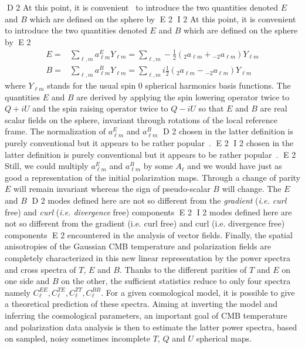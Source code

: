 D 2
At this point, it is convenient~\cite{zalda} to introduce the two quantities denoted $E$ and $B$ which are defined on the sphere by 
E 2
I 2
At this point, it is convenient~\citep{zalda} to introduce the two quantities denoted $E$ and $B$ which are defined on the sphere by 
E 2
\begin{eqnarray}\label{EB}
E = &  \sum_{\ell, m}   a_{\ell m} ^E Y_{\ell m} =  \sum_{\ell, m}  - \frac{ 1}{2}   ({_{ 2}a_{\ell m}}  +  {_{- 2}a_{\ell m}} )    Y_{\ell m} \\ \nonumber
B = & \sum_{\ell, m}   a_{\ell m} ^B Y_{\ell m} =  \sum_{\ell, m}  i \frac{ 1}{2}    ({_{ 2}a_{\ell m}}  -  {_{- 2}a_{\ell m}} )   Y_{\ell m} 
\end{eqnarray} 
where $Y_{\ell m}$ stands for the usual spin 0 spherical harmonics basis functions. The quantities $E$ and $B$ are derived by applying 
the spin lowering operator twice to $Q + i U$  and the spin raising operator twice to $Q - i U$ so that $E$ and $B$ are real scalar 
fields on the sphere, invariant through rotations of the local reference frame. The normalization of $a_{\ell m} ^E$ and $a_{\ell m} ^B$ 
D 2
chosen in the latter definition is purely conventional but it appears to be rather popular~\cite{1997PhRvD..55.1830Z,2003PhRvD..67b3501B}. 
E 2
I 2
chosen in the latter definition is purely conventional but it appears to be rather popular~\citep{1997PhRvD..55.1830Z,2003PhRvD..67b3501B}. 
E 2
Still, we could multiply $a_{\ell m} ^E$ and $a_{\ell m} ^B$ by some $A_{\ell}$ and we would have just as good a representation of the initial 
polarization maps. Through a change of parity $E$ will remain invariant whereas the sign of pseudo-scalar $B$ will change. The $E$ and $B$ 
D 2
modes defined here are not so different from the \emph{gradient} (\emph{i.e. curl} free) and \emph{curl} (\emph{i.e. divergence} free) components 
E 2
I 2
modes defined here are not so different from the gradient (i.e. curl free) and curl (i.e. divergence free) components 
E 2
encountered in the analysis of vector fields. Finally, the spatial anisotropies of the Gaussian CMB temperature and polarization fields are 
completely characterized in this new linear representation by the power spectra and cross spectra of $T$, $E$ and $B$. Thanks to the different 
parities of $T$ and $E$ on one side and $B$ on the other, the sufficient statistics reduce to only four spectra namely $C_\ell^{EE}, C_\ell^{TE}, 
C_\ell^{TT}, C_\ell^{BB}$. For a given cosmological model, it is possible to give a theoretical prediction of these spectra. Aiming at inverting 
the model and inferring the cosmological parameters, an important goal of CMB temperature and polarization data analysis is then to estimate the 
latter power spectra, based on sampled, noisy sometimes incomplete $T$, $Q$ and $U$ spherical maps.  

